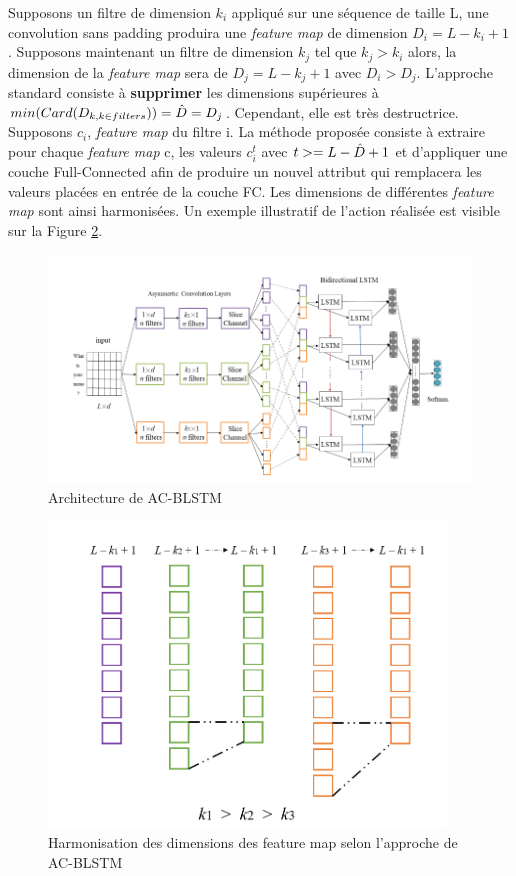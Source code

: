 \noindent Supposons un filtre de dimension $k_i$ appliqué sur une séquence de taille L, une convolution sans padding produira une \textit{feature map} de dimension $D_i=L-k_i+1$. Supposons maintenant un filtre de dimension $k_j$ tel que $k_j > k_i$ alors, la dimension de la \textit{feature map} sera de $D_j=L-k_j+1$ avec $D_i>D_j$. L'approche standard consiste à \textbf{supprimer} les dimensions supérieures à $min(Card(D_{k, k \in filters}))=\Hat{D}=D_j$. Cependant, elle est très destructrice.\\

\noindent Supposons $c_i$, \textit{feature map} du filtre i. La méthode proposée consiste à extraire pour chaque \textit{feature map} c, les valeurs $c_i^t$ avec $t>=L-\Hat{D}+1$ et d'appliquer une couche Full-Connected afin de produire un nouvel attribut qui remplacera les valeurs placées en entrée de la couche FC. Les dimensions de différentes \textit{feature map} sont ainsi harmonisées. Un exemple illustratif de l'action réalisée est visible sur la Figure \ref{acblstm2}.

\begin{figure}
\centering
\includegraphics[scale=0.3]{./tex/natural-language-processing/acblstm.png}
\caption{Architecture de AC-BLSTM}
\label{acblstm}
\end{figure}

\begin{figure}
\centering
\includegraphics[scale=0.4]{./tex/natural-language-processing/acblsm2.png}
\caption{Harmonisation des dimensions des feature map selon l'approche de AC-BLSTM}
\label{acblstm2}
\end{figure}

